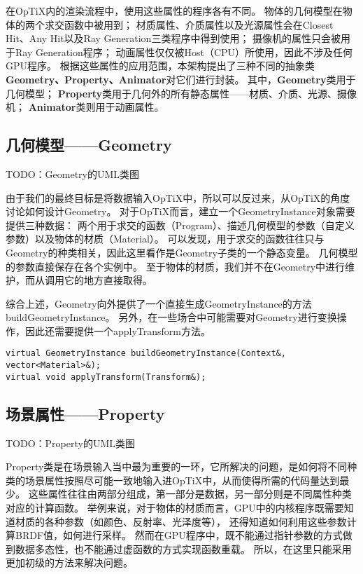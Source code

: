 在OpTiX内的渲染流程中，使用这些属性的程序各有不同。
物体的几何模型在物体的两个求交函数中被用到；
材质属性、介质属性以及光源属性会在Closest Hit、Any Hit以及Ray Generation三类程序中得到使用；
摄像机的属性只会被用于Ray Generation程序；
动画属性仅仅被Host（CPU）所使用，因此不涉及任何GPU程序。
根据这些属性的应用范围，本架构提出了三种不同的抽象类\textbf{Geometry、Property、Animator}对它们进行封装。
其中，\textbf{Geometry}类用于几何模型；
\textbf{Property}类用于几何外的所有静态属性——材质、介质、光源、摄像机；
\textbf{Animator}类则用于动画属性。

\subsection{几何模型——Geometry}
TODO：Geometry的UML类图

由于我们的最终目标是将数据输入OpTiX中，所以可以反过来，从OpTiX的角度讨论如何设计Geometry。
对于OpTiX而言，建立一个GeometryInstance对象需要提供三种数据：
两个用于求交的函数（Program）、描述几何模型的参数（自定义参数）以及物体的材质（Material）。
可以发现，用于求交的函数往往只与Geometry的种类相关，因此这里看作是Geometry子类的一个静态变量。
几何模型的参数直接保存在各个实例中。
至于物体的材质，我们并不在Geometry中进行维护，而从调用它的地方直接取得。

综合上述，Geometry向外提供了一个直接生成GeometryInstance的方法buildGeometryInstance。
另外，在一些场合中可能需要对Geometry进行变换操作，因此还需要提供一个applyTransform方法。

\lstset{language=C++}
\begin{lstlisting}
virtual GeometryInstance buildGeometryInstance(Context&, vector<Material>&);
virtual void applyTransform(Transform&);
\end{lstlisting}

\subsection{场景属性——Property}
TODO：Property的UML类图

Property类是在场景输入当中最为重要的一环，它所解决的问题，是如何将不同种类的场景属性按照尽可能一致地输入进OpTiX中，从而使得所需的代码量达到最少。
这些属性往往由两部分组成，第一部分是数据，另一部分则是不同属性种类对应的计算函数。
举例来说，对于物体的材质而言，GPU中的内核程序既需要知道材质的各种参数（如颜色、反射率、光泽度等），
还得知道如何利用这些参数计算BRDF值，如何进行采样。
然而在GPU程序中，既不能通过指针参数的方式做到数据多态性，也不能通过虚函数的方式实现函数重载。
所以，在这里只能采用更加初级的方法来解决问题。

